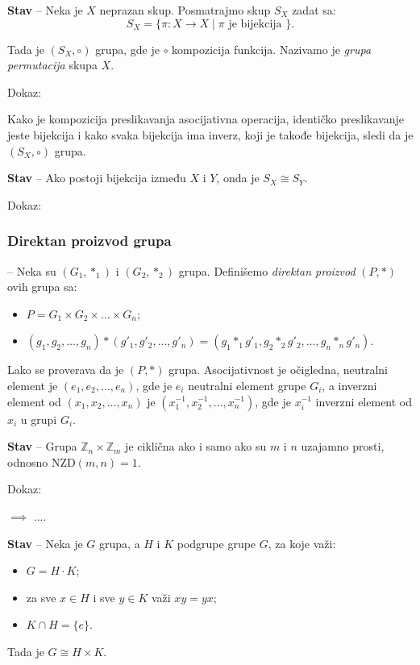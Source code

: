 \documentclass[a4paper,12pt]{article}
\newcommand{\f}[1]{\(#1\)}
\begin{document}
  \textbf{Stav} -- Neka je \f{X} neprazan skup. Posmatrajmo skup \f{S_X} zadat sa:
  \[
  S_X = \{ \pi: X \rightarrow X \mid \pi \text{ je bijekcija } \}.
  \]

  Tada je \f{(S_X, \circ)} grupa, gde je \f{\circ} kompozicija funkcija. Nazivamo je \emph{grupa permutacija} skupa \f{X}.

  Dokaz:

  Kako je kompozicija preslikavanja asocijativna operacija, identičko preslikavanje jeste bijekcija i kako svaka
  bijekcija ima inverz, koji je takođe bijekcija, sledi da je \f{(S_X, \circ)} grupa.

  \textbf{Stav} -- Ako postoji bijekcija između \f{X} i \f{Y}, onda je \f{S_X \cong S_Y}.

  Dokaz:

  

  \subsubsection{Direktan proizvod grupa}

   -- Neka su \f{(G_1, *_1)} i \f{(G_2, *_2)} grupa. Definišemo \emph{direktan proizvod} \f{(P, *)} ovih grupa sa:
 \begin{itemize}
  \item \f{P = G_1 \times G_2 \times \dots \times G_n;}
  \item \f{(g_1,g_2,\dots,g_n) * (g'_1,g'_2,\dots,g'_n) = (g_1 *_1 g'_1, g_2 *_2 g'_2, \dots, g_n *_n g'_n).}
 \end{itemize}
 Lako se proverava da je \f{(P, *)} grupa. Asocijativnost je očigledna, neutralni element je \f{(e_1, e_2, \dots, e_n)}, gde je \f{e_i} neutralni element grupe \f{G_i}, a inverzni element od \f{(x_1, x_2, \dots, x_n)} je \f{(x_1^{-1}, x_2^{-1}, \dots, x_n^{-1})}, gde je \f{x_i^{-1}} inverzni element od \f{x_i} u grupi \f{G_i}.

\textbf{Stav} -- Grupa \f{\mathbb{Z}_n \times \mathbb{Z}_m} je ciklična ako i samo ako su \f{m} i \f{n} uzajamno prosti, odnosno \f{\text{NZD}(m, n) = 1}.

Dokaz:

\f{\implies} ....

\textbf{Stav} -- Neka je \f{G} grupa, a \f{H} i \f{K} podgrupe grupe \f{G}, za koje važi:
\begin{itemize}
  \item \f{G = H \cdot K};
  \item za sve \f{x \in H} i sve \f{y \in K} važi \f{xy = yx};
  \item \f{K \cap H = \{ e \}}.
\end{itemize}
Tada je \f{G \cong H \times K}.
\end{document}
